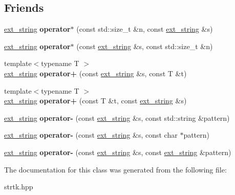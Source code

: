 \subsection*{Friends}
\begin{DoxyCompactItemize}
\item 
\hypertarget{classstrtk_1_1ext__string_ae45d367a03f4402e93e819e84253bfaf}{\hyperlink{classstrtk_1_1ext__string}{ext\-\_\-string} {\bfseries operator$\ast$} (const std\-::size\-\_\-t \&n, const \hyperlink{classstrtk_1_1ext__string}{ext\-\_\-string} \&s)}\label{classstrtk_1_1ext__string_ae45d367a03f4402e93e819e84253bfaf}

\item 
\hypertarget{classstrtk_1_1ext__string_a0805d5292ded76de84789c2981eab929}{\hyperlink{classstrtk_1_1ext__string}{ext\-\_\-string} {\bfseries operator$\ast$} (const \hyperlink{classstrtk_1_1ext__string}{ext\-\_\-string} \&s, const std\-::size\-\_\-t \&n)}\label{classstrtk_1_1ext__string_a0805d5292ded76de84789c2981eab929}

\item 
\hypertarget{classstrtk_1_1ext__string_acc1a45ebc03198dd0ad7e3ae17b35172}{{\footnotesize template$<$typename T $>$ }\\\hyperlink{classstrtk_1_1ext__string}{ext\-\_\-string} {\bfseries operator+} (const \hyperlink{classstrtk_1_1ext__string}{ext\-\_\-string} \&s, const T \&t)}\label{classstrtk_1_1ext__string_acc1a45ebc03198dd0ad7e3ae17b35172}

\item 
\hypertarget{classstrtk_1_1ext__string_a9c08b0a72c1209ada8211cc49bf39af4}{{\footnotesize template$<$typename T $>$ }\\\hyperlink{classstrtk_1_1ext__string}{ext\-\_\-string} {\bfseries operator+} (const T \&t, const \hyperlink{classstrtk_1_1ext__string}{ext\-\_\-string} \&s)}\label{classstrtk_1_1ext__string_a9c08b0a72c1209ada8211cc49bf39af4}

\item 
\hypertarget{classstrtk_1_1ext__string_ac10dd5a61ce73046ddcd9b1a50e6eb45}{\hyperlink{classstrtk_1_1ext__string}{ext\-\_\-string} {\bfseries operator-\/} (const \hyperlink{classstrtk_1_1ext__string}{ext\-\_\-string} \&s, const std\-::string \&pattern)}\label{classstrtk_1_1ext__string_ac10dd5a61ce73046ddcd9b1a50e6eb45}

\item 
\hypertarget{classstrtk_1_1ext__string_a7b7096018804ac09008c5a2198a1aa15}{\hyperlink{classstrtk_1_1ext__string}{ext\-\_\-string} {\bfseries operator-\/} (const \hyperlink{classstrtk_1_1ext__string}{ext\-\_\-string} \&s, const char $\ast$pattern)}\label{classstrtk_1_1ext__string_a7b7096018804ac09008c5a2198a1aa15}

\item 
\hypertarget{classstrtk_1_1ext__string_a5ef7087ec839638128fbde61d4821742}{\hyperlink{classstrtk_1_1ext__string}{ext\-\_\-string} {\bfseries operator-\/} (const \hyperlink{classstrtk_1_1ext__string}{ext\-\_\-string} \&s, const \hyperlink{classstrtk_1_1ext__string}{ext\-\_\-string} \&pattern)}\label{classstrtk_1_1ext__string_a5ef7087ec839638128fbde61d4821742}

\end{DoxyCompactItemize}


The documentation for this class was generated from the following file\-:\begin{DoxyCompactItemize}
\item 
strtk.\-hpp\end{DoxyCompactItemize}
